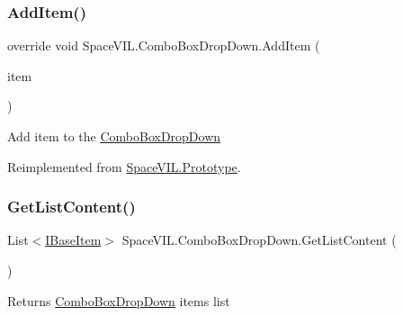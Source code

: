\subsubsection{\texorpdfstring{Add\+Item()}{AddItem()}}
{\footnotesize\ttfamily override void Space\+V\+I\+L.\+Combo\+Box\+Drop\+Down.\+Add\+Item (\begin{DoxyParamCaption}\item[{\mbox{\hyperlink{interface_space_v_i_l_1_1_core_1_1_i_base_item}{I\+Base\+Item}}}]{item }\end{DoxyParamCaption})\hspace{0.3cm}{\ttfamily [virtual]}}



Add item to the \mbox{\hyperlink{class_space_v_i_l_1_1_combo_box_drop_down}{Combo\+Box\+Drop\+Down}} 



Reimplemented from \mbox{\hyperlink{class_space_v_i_l_1_1_prototype}{Space\+V\+I\+L.\+Prototype}}.

\mbox{\label{class_space_v_i_l_1_1_combo_box_drop_down_a44d05f922b3320c8f4ed7563656dfe56}} 
\subsubsection{\texorpdfstring{Get\+List\+Content()}{GetListContent()}}
{\footnotesize\ttfamily List$<$\mbox{\hyperlink{interface_space_v_i_l_1_1_core_1_1_i_base_item}{I\+Base\+Item}}$>$ Space\+V\+I\+L.\+Combo\+Box\+Drop\+Down.\+Get\+List\+Content (\begin{DoxyParamCaption}{ }\end{DoxyParamCaption})}



Returns \mbox{\hyperlink{class_space_v_i_l_1_1_combo_box_drop_down}{Combo\+Box\+Drop\+Down}} items list 

\mbox{\label{class_space_v_i_l_1_1_combo_box_drop_down_a645a040cf0880708d4fbc86e5392ad94}} 
